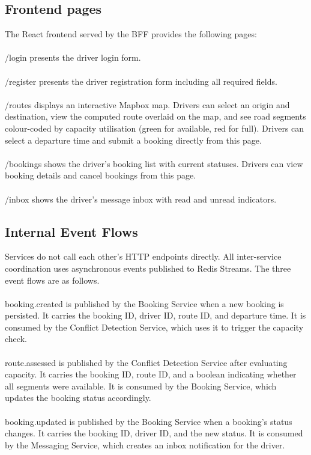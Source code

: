 \documentclass{article}
\begin{document}
\subsection{Frontend pages}
The React frontend served by the BFF provides the following pages:\\\\
/login presents the driver login form.\\\\
/register presents the driver registration form including all required fields.\\\\
/routes displays an interactive Mapbox map. Drivers can select an origin and destination, view the computed route overlaid on the map, and see road segments colour-coded by capacity utilisation (green for available, red for full). Drivers can select a departure time and submit a booking directly from this page.\\\\
/bookings shows the driver's booking list with current statuses. Drivers can view booking details and cancel bookings from this page. \\\\
/inbox shows the driver's message inbox with read and unread indicators.

\subsection{Internal Event Flows}
Services do not call each other's HTTP endpoints directly. All inter-service coordination uses asynchronous events published to Redis Streams. The three event flows are as follows.\\\\
booking.created is published by the Booking Service when a new booking is persisted. It carries the booking ID, driver ID, route ID, and departure time. It is consumed by the Conflict Detection Service, which uses it to trigger the capacity check. \\\\
route.assessed is published by the Conflict Detection Service after evaluating capacity. It carries the booking ID, route ID, and a boolean indicating whether all segments were available. It is consumed by the Booking Service, which updates the booking status accordingly. \\\\
booking.updated is published by the Booking Service when a booking's status changes. It carries the booking ID, driver ID, and the new status. It is consumed by the Messaging Service, which creates an inbox notification for the driver.
\end{document}
